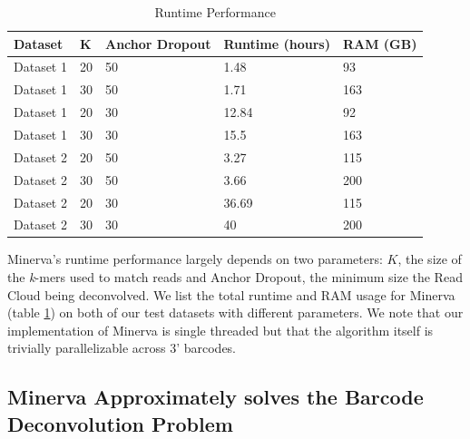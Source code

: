 \begin{table}[]
\centering
\caption{Runtime Performance}
\label{performance}
\begin{tabular}{|l|l|l|l|l|}
\hline
Dataset & K & Anchor Dropout & Runtime (hours) & RAM (GB)\\ \hline \hline
Dataset 1 & 20 & 50 & 1.48 & 93 \\
Dataset 1 & 30 & 50 & 1.71 & 163 \\
Dataset 1 & 20 & 30 & 12.84 & 92 \\
Dataset 1 & 30 & 30 & 15.5 & 163 \\
Dataset 2 & 20 & 50 & 3.27 & 115 \\
Dataset 2 & 30 & 50 & 3.66 & 200 \\
Dataset 2 & 20 & 30 & 36.69 & 115 \\
Dataset 2 & 30 & 30 & 40 & 200 \\ \hline
\end{tabular}

\end{table}

Minerva's runtime performance largely depends on two parameters: $K$, the size of the \textit{k}-mers used to match reads and Anchor Dropout, the minimum size the Read Cloud being deconvolved. We list the total runtime and RAM usage for Minerva (table \ref{performance}) on both of our test datasets with different parameters. We note that our implementation of Minerva is single threaded but that the algorithm itself is trivially parallelizable across 3' barcodes. 

\subsection*{ Minerva Approximately solves the Barcode Deconvolution Problem}
\label{sec:purity}

